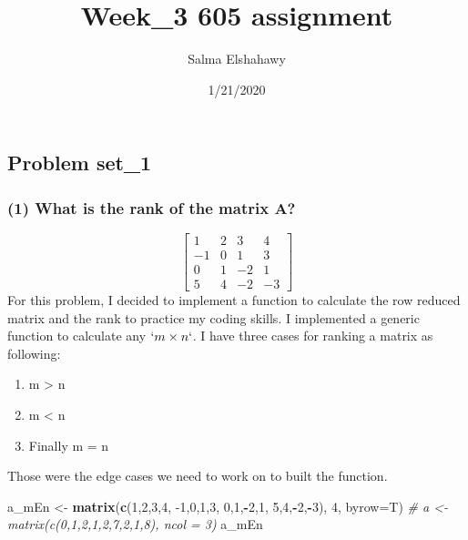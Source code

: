 \documentclass[]{article}
\title{Week\_3 605 assignment}
\author{Salma Elshahawy}
\date{1/21/2020}
\newenvironment{Shaded}{\begin{snugshade}}{\end{snugshade}}
\newcommand{\CommentTok}[1]{\textcolor[rgb]{0.56,0.35,0.01}{\textit{#1}}}
\newcommand{\DataTypeTok}[1]{\textcolor[rgb]{0.13,0.29,0.53}{#1}}
\newcommand{\DecValTok}[1]{\textcolor[rgb]{0.00,0.00,0.81}{#1}}
\newcommand{\KeywordTok}[1]{\textcolor[rgb]{0.13,0.29,0.53}{\textbf{#1}}}
\newcommand{\NormalTok}[1]{#1}
\newcommand{\OperatorTok}[1]{\textcolor[rgb]{0.81,0.36,0.00}{\textbf{#1}}}
\newcommand{\StringTok}[1]{\textcolor[rgb]{0.31,0.60,0.02}{#1}}
\providecommand{\tightlist}{%
  \setlength{\itemsep}{0pt}\setlength{\parskip}{0pt}}
\begin{document}
\maketitle

\hypertarget{problem-set_1}{%
\subsection{Problem set\_1}\label{problem-set_1}}

\hypertarget{what-is-the-rank-of-the-matrix-a}{%
\subsubsection{(1) What is the rank of the matrix
A?}\label{what-is-the-rank-of-the-matrix-a}}

\[\begin{bmatrix} 1 & 2 & 3 & 4 \\ -1 & 0 & 1 & 3 \\ 0 & 1 & -2 & 1 \\ 5 & 4 & -2 & -3 \end{bmatrix}\]
For this problem, I decided to implement a function to calculate the row
reduced matrix and the rank to practice my coding skills. I implemented
a generic function to calculate any \(`m\times n`\). I have three cases
for ranking a matrix as following:

\begin{enumerate}
\def\labelenumi{\arabic{enumi}.}
\tightlist
\item
  m \textgreater{} n
\item
  m \textless{} n
\item
  Finally m = n
\end{enumerate}

Those were the edge cases we need to work on to built the function.

\begin{Shaded}
\begin{Highlighting}[]
\NormalTok{a_mEn <-}\StringTok{ }\KeywordTok{matrix}\NormalTok{(}\KeywordTok{c}\NormalTok{(}\DecValTok{1}\NormalTok{,}\DecValTok{2}\NormalTok{,}\DecValTok{3}\NormalTok{,}\DecValTok{4}\NormalTok{,}
              \DecValTok{-1}\NormalTok{,}\DecValTok{0}\NormalTok{,}\DecValTok{1}\NormalTok{,}\DecValTok{3}\NormalTok{,}
              \DecValTok{0}\NormalTok{,}\DecValTok{1}\NormalTok{,}\OperatorTok{-}\DecValTok{2}\NormalTok{,}\DecValTok{1}\NormalTok{,}
              \DecValTok{5}\NormalTok{,}\DecValTok{4}\NormalTok{,}\OperatorTok{-}\DecValTok{2}\NormalTok{,}\OperatorTok{-}\DecValTok{3}\NormalTok{), }\DecValTok{4}\NormalTok{, }\DataTypeTok{byrow=}\NormalTok{T)}
\CommentTok{# a <- matrix(c(0,1,2,1,2,7,2,1,8), ncol = 3)}
\NormalTok{a_mEn}
\end{Highlighting}
\end{Shaded}
\end{document}
